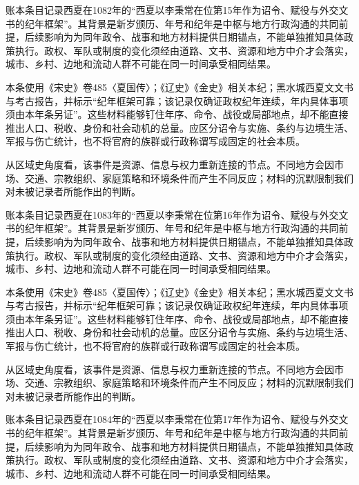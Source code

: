 账本条目记录西夏在1082年的“西夏以李秉常在位第15年作为诏令、赋役与外交文书的纪年框架”。其背景是新岁颁历、年号和纪年是中枢与地方行政沟通的共同前提，后续影响为为同年政令、战事和地方材料提供日期锚点，不能单独推知具体政策执行。政权、军队或制度的变化须经由道路、文书、资源和地方中介才会落实，城市、乡村、边地和流动人群不可能在同一时间承受相同结果。

本条使用《宋史》卷485〈夏国传〉；《辽史》《金史》相关本纪；黑水城西夏文文书与考古报告，并标示“纪年框架可靠；该记录仅确证政权纪年连续，年内具体事项须由本年条另证”。这些材料能够钉住年序、命令、战役或局部地点，却不能直接推出人口、税收、身份和社会动机的总量。应区分诏令与实施、条约与边境生活、军报与伤亡统计，也不将官府的族群或行政称谓写成固定的社会本质。

从区域史角度看，该事件是资源、信息与权力重新连接的节点。不同地方会因市场、交通、宗教组织、家庭策略和环境条件而产生不同反应；材料的沉默限制我们对未被记录者所能作出的判断。

账本条目记录西夏在1083年的“西夏以李秉常在位第16年作为诏令、赋役与外交文书的纪年框架”。其背景是新岁颁历、年号和纪年是中枢与地方行政沟通的共同前提，后续影响为为同年政令、战事和地方材料提供日期锚点，不能单独推知具体政策执行。政权、军队或制度的变化须经由道路、文书、资源和地方中介才会落实，城市、乡村、边地和流动人群不可能在同一时间承受相同结果。

本条使用《宋史》卷485〈夏国传〉；《辽史》《金史》相关本纪；黑水城西夏文文书与考古报告，并标示“纪年框架可靠；该记录仅确证政权纪年连续，年内具体事项须由本年条另证”。这些材料能够钉住年序、命令、战役或局部地点，却不能直接推出人口、税收、身份和社会动机的总量。应区分诏令与实施、条约与边境生活、军报与伤亡统计，也不将官府的族群或行政称谓写成固定的社会本质。

从区域史角度看，该事件是资源、信息与权力重新连接的节点。不同地方会因市场、交通、宗教组织、家庭策略和环境条件而产生不同反应；材料的沉默限制我们对未被记录者所能作出的判断。

账本条目记录西夏在1084年的“西夏以李秉常在位第17年作为诏令、赋役与外交文书的纪年框架”。其背景是新岁颁历、年号和纪年是中枢与地方行政沟通的共同前提，后续影响为为同年政令、战事和地方材料提供日期锚点，不能单独推知具体政策执行。政权、军队或制度的变化须经由道路、文书、资源和地方中介才会落实，城市、乡村、边地和流动人群不可能在同一时间承受相同结果。

